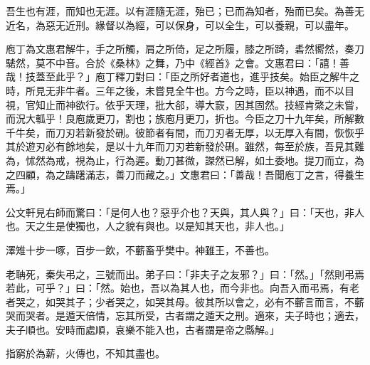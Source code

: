 
\begin{pinyinscope}
吾生也有涯，而知也无涯。以有涯隨无涯，殆已；已而為知者，殆而已矣。為善无近名，為惡无近刑。緣督以為經，可以保身，可以全生，可以養親，可以盡年。

庖丁為文惠君解牛，手之所觸，肩之所倚，足之所履，膝之所踦，砉然嚮然，奏刀騞然，莫不中音。合於《桑林》之舞，乃中《經首》之會。文惠君曰：「譆！善哉！技蓋至此乎？」庖丁釋刀對曰：「臣之所好者道也，進乎技矣。始臣之解牛之時，所見无非牛者。三年之後，未嘗見全牛也。方今之時，臣以神遇，而不以目視，官知止而神欲行。依乎天理，批大郤，導大窾，因其固然。技經肯綮之未嘗，而況大軱乎！良庖歲更刀，割也；族庖月更刀，折也。今臣之刀十九年矣，所解數千牛矣，而刀刃若新發於硎。彼節者有間，而刀刃者无厚，以无厚入有間，恢恢乎其於遊刃必有餘地矣，是以十九年而刀刃若新發於硎。雖然，每至於族，吾見其難為，怵然為戒，視為止，行為遲。動刀甚微，謋然已解，如土委地。提刀而立，為之四顧，為之躊躇滿志，善刀而藏之。」文惠君曰：「善哉！吾聞庖丁之言，得養生焉。」

公文軒見右師而驚曰：「是何人也？惡乎介也？天與，其人與？」曰：「天也，非人也。天之生是使獨也，人之貌有與也。以是知其天也，非人也。」

澤雉十步一啄，百步一飲，不蘄畜乎樊中。神雖王，不善也。

老聃死，秦失弔之，三號而出。弟子曰：「非夫子之友邪？」曰：「然。」「然則弔焉若此，可乎？」曰：「然。始也，吾以為其人也，而今非也。向吾入而弔焉，有老者哭之，如哭其子；少者哭之，如哭其母。彼其所以會之，必有不蘄言而言，不蘄哭而哭者。是遁天倍情，忘其所受，古者謂之遁天之刑。適來，夫子時也；適去，夫子順也。安時而處順，哀樂不能入也，古者謂是帝之縣解。」

指窮於為薪，火傳也，不知其盡也。


\end{pinyinscope}